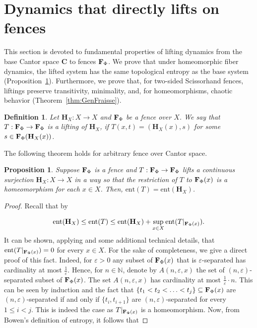 \documentclass[11pt]{amsart}
\newtheorem{proposition}[theorem]{Proposition}
\newtheorem{definition}[theorem]{Definition}
\newcommand{\N}{\mathbb{N}}  %
\newcommand{\ent}{\mathrm{ent}}
\newcommand{\cantor}{\mathbf C}
\newcommand{\fence}{{\bf F}_{\Phi}{}}
\newcommand{\homeocantor}{{\mathbf H}_{X}}
\begin{document}
{\section{Dynamics that directly lifts on fences}\label{sec:Dynamics that directly lifts}

This section is devoted to fundamental properties of lifting dynamics from the base Cantor space $\cantor$ to fences $\fence$. We prove that under homeomorphic fiber dynamics, the lifted system has the same topological entropy as the base system (Proposition~\ref{prop:entropy}). Furthermore, we prove that, for two-sided Scissorhand fences, liftings preserve transitivity, minimality, and, for homeomorphisms, chaotic behavior (Theorem~\ref{thm:GenFraisse}). 

\begin{definition}\label{def:lifting} 
    Let $\homeocantor: X \rightarrow X$ and $\fence$ be a fence over $X$. We say that $T: \fence \rightarrow \fence$ is a lifting of $\homeocantor$, if $T(x,t) = (\homeocantor(x),s)$ for some $s \in \fence (\homeocantor(x))$.
\end{definition}
The following theorem holds for arbitrary fence over Cantor space.  
\begin{proposition}\label{prop:entropy}
    Suppose $\fence$ is a fence and $T:\fence \rightarrow \fence$ lifts a continuous surjection $\homeocantor:X \rightarrow X$ in a way so that the restriction of $T$ to $\fence(x)$ is a homeomorphism for each $x \in X$. Then, $\ent(T) = \ent (\homeocantor)$.
\end{proposition}

\begin{proof}
Recall that by \cite[Theorem 17]{Bowen}

\[\ent(\homeocantor)\leq \ent(T)\leq \ent(\homeocantor) + \sup_{x\in X} \ent(T|_{ \fence(x)}). \]
It can be shown, applying \cite[Theorem D]{KolyadaSnoha} and some additional technical details, that $\ent(T|_{\fence(x)})=0$ for every $x\in X$.
  For the sake of completeness, we give a direct proof of this fact. Indeed, for $\varepsilon>0$ any subset of $\fence(x)$ that is $\varepsilon$-separated has cardinality at most $\frac{1}{\varepsilon}$. Hence, for $n \in \N$, denote by $A(n, \varepsilon,x)$ the set of $(n,\varepsilon)$-separated subset of $\fence(x)$. The set $A(n, \varepsilon,x)$ has cardinality at most $\frac{1}{\varepsilon}\cdot n$. This can be seen by induction and the fact that $\{t_1 < t_2 < \ldots < t_j\} \subseteq \fence(x)$ are $(n,\varepsilon)$-separated if and only if $\{t_i,t_{i+1}\}$ are $(n,\varepsilon)$-separated for every $1 \le i < j$. This is indeed the case as $T|_{\fence(x)}$ is a homeomorphism.  Now, from Bowen's definition of entropy, it follows that  


\end{proof}}
\end{document}
